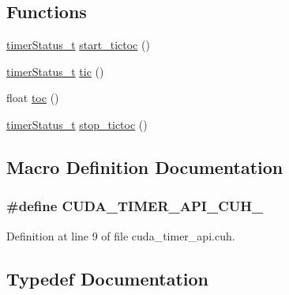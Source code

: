 \subsection*{Functions}
\begin{DoxyCompactItemize}
\item 
\hyperlink{cuda__timer__api_8cuh_a27fad73c3da5a06a8d7ae755180ce324}{timer\+Status\+\_\+t} \hyperlink{cuda__timer__api_8cuh_aeab828c5d6f21aa46f1afb16c2615e25}{start\+\_\+tictoc} ()
\item 
\hyperlink{cuda__timer__api_8cuh_a27fad73c3da5a06a8d7ae755180ce324}{timer\+Status\+\_\+t} \hyperlink{cuda__timer__api_8cuh_a45855e615e2fae63af48e50e13df3eb5}{tic} ()
\item 
float \hyperlink{cuda__timer__api_8cuh_a83adf8e26e2c33497523a260bb6e42d8}{toc} ()
\item 
\hyperlink{cuda__timer__api_8cuh_a27fad73c3da5a06a8d7ae755180ce324}{timer\+Status\+\_\+t} \hyperlink{cuda__timer__api_8cuh_ae2154db9dc4bc05acb8378e77a1b5a52}{stop\+\_\+tictoc} ()
\end{DoxyCompactItemize}


\subsection{Macro Definition Documentation}
\hypertarget{cuda__timer__api_8cuh_ae0cf6aec8edd551cd73bb8a5578a2ba4}{}
\subsubsection[{C\+U\+D\+A\+\_\+\+T\+I\+M\+E\+R\+\_\+\+A\+P\+I\+\_\+\+C\+U\+H\+\_\+}]{\setlength{\rightskip}{0pt plus 5cm}\#define C\+U\+D\+A\+\_\+\+T\+I\+M\+E\+R\+\_\+\+A\+P\+I\+\_\+\+C\+U\+H\+\_\+}\label{cuda__timer__api_8cuh_ae0cf6aec8edd551cd73bb8a5578a2ba4}


Definition at line 9 of file cuda\+\_\+timer\+\_\+api.\+cuh.



\subsection{Typedef Documentation}
\hypertarget{cuda__timer__api_8cuh_a27fad73c3da5a06a8d7ae755180ce324}{}

